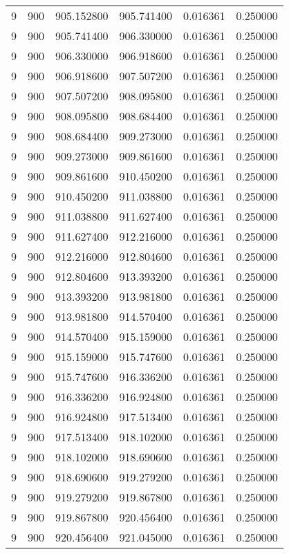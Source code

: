 \begin{longtable}{rrrrrr}
9 & 900 & 905.152800 & 905.741400 & 0.016361 & 0.250000 \\
9 & 900 & 905.741400 & 906.330000 & 0.016361 & 0.250000 \\
9 & 900 & 906.330000 & 906.918600 & 0.016361 & 0.250000 \\
9 & 900 & 906.918600 & 907.507200 & 0.016361 & 0.250000 \\
9 & 900 & 907.507200 & 908.095800 & 0.016361 & 0.250000 \\
9 & 900 & 908.095800 & 908.684400 & 0.016361 & 0.250000 \\
9 & 900 & 908.684400 & 909.273000 & 0.016361 & 0.250000 \\
9 & 900 & 909.273000 & 909.861600 & 0.016361 & 0.250000 \\
9 & 900 & 909.861600 & 910.450200 & 0.016361 & 0.250000 \\
9 & 900 & 910.450200 & 911.038800 & 0.016361 & 0.250000 \\
9 & 900 & 911.038800 & 911.627400 & 0.016361 & 0.250000 \\
9 & 900 & 911.627400 & 912.216000 & 0.016361 & 0.250000 \\
9 & 900 & 912.216000 & 912.804600 & 0.016361 & 0.250000 \\
9 & 900 & 912.804600 & 913.393200 & 0.016361 & 0.250000 \\
9 & 900 & 913.393200 & 913.981800 & 0.016361 & 0.250000 \\
9 & 900 & 913.981800 & 914.570400 & 0.016361 & 0.250000 \\
9 & 900 & 914.570400 & 915.159000 & 0.016361 & 0.250000 \\
9 & 900 & 915.159000 & 915.747600 & 0.016361 & 0.250000 \\
9 & 900 & 915.747600 & 916.336200 & 0.016361 & 0.250000 \\
9 & 900 & 916.336200 & 916.924800 & 0.016361 & 0.250000 \\
9 & 900 & 916.924800 & 917.513400 & 0.016361 & 0.250000 \\
9 & 900 & 917.513400 & 918.102000 & 0.016361 & 0.250000 \\
9 & 900 & 918.102000 & 918.690600 & 0.016361 & 0.250000 \\
9 & 900 & 918.690600 & 919.279200 & 0.016361 & 0.250000 \\
9 & 900 & 919.279200 & 919.867800 & 0.016361 & 0.250000 \\
9 & 900 & 919.867800 & 920.456400 & 0.016361 & 0.250000 \\
9 & 900 & 920.456400 & 921.045000 & 0.016361 & 0.250000 \\

\end{longtable}
